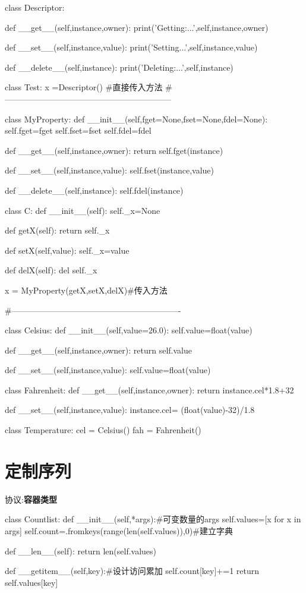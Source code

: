 \documentclass[a4paper,10pt]{ctexart}
\begin{document}
\begin{python}

class Descriptor:

    def __get__(self,instance,owner):
        print('Getting:...',self,instance,owner)

    def __set__(self,instance,value):
        print('Setting...',self,instance,value)

    def __delete__(self,instance):
        print('Deleting:...',self,instance)

class Test:
	x =Descriptor()
#直接传入方法
#------------------------------------------------------------

class MyProperty:
    def __init__(self,fget=None,fset=None,fdel=None):
        self.fget=fget
        self.fset=fset
        self.fdel=fdel

    def __get__(self,instance,owner):
        return self.fget(instance)

    def __set__(self,instance,value):
        self.fset(instance,value)

    def __delete__(self,instance):
        self.fdel(instance)

class C:
    def __init__(self):
        self._x=None

    def getX(self):
        return self._x

    def setX(self,value):
        self._x=value

    def delX(self):
        del self._x

    x = MyProperty(getX,setX,delX)#传入方法

#-------------------------------------------------------------


class Celsius:
    def __init__(self,value=26.0):
        self.value=float(value)

    def __get__(self,instance,owner):
        return self.value

    def __set__(self,instance,value):
        self.value=float(value)

class Fahrenheit:
    def __get__(self,instance,owner):
        return instance.cel*1.8+32

    def __set__(self,instance,value):
        instance.cel= (float(value)-32)/1.8

class Temperature:
    cel = Celsius()
    fah = Fahrenheit()

\end{python}

\section{定制序列}
协议:\textbf{容器类型}
\begin{python}
class Countlist:
      def __init__(self,*args):#可变数量的args
            self.values=[x for x in args]
            self.count={}.fromkeys(range(len(self.values)),0)#建立字典

      def __len__(self):
            return len(self.values)

      def __getitem__(self,key):#设计访问累加
            self.count[key]+=1
            return self.values[key]
\end{python}
\end{document}
